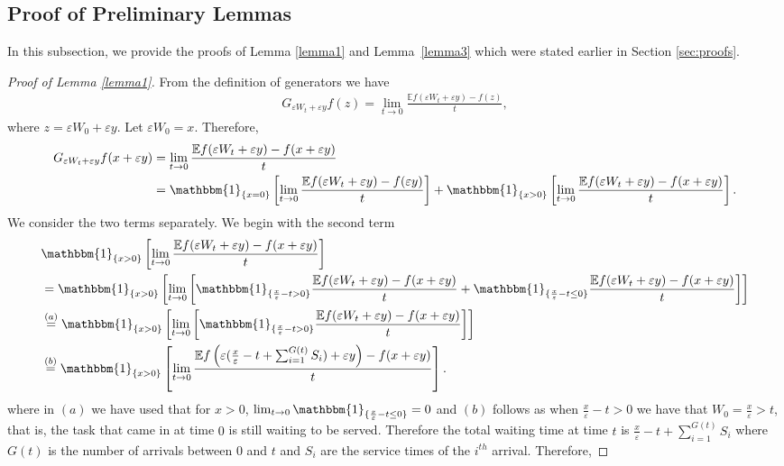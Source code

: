 \documentclass[11pt,letterpaper,reqno]{article}
\theoremstyle{thmstyleone}%
\theoremstyle{thmstyletwo}%
\theoremstyle{thmstylethree}%
\numberwithin{equation}{section}
\begin{document}
\subsection{Proof of Preliminary Lemmas}\label{sec:preliminarylemmaproof}
In this subsection, we provide the proofs of Lemma \ref{lemma1} and Lemma~\ref{lemma3} which were stated earlier in Section \ref{sec:proofs}.
\begin{proof}[Proof of Lemma \ref{lemma1}]
    From the definition of generators we have
\begin{align*}
   G_{\varepsilon W_t+\varepsilon y}f(z)=\lim_{t \to 0} \frac{\mathbb Ef(\varepsilon W_t+\varepsilon y)-f(z)}{t},
\end{align*}
where $z=\varepsilon W_0+\varepsilon y$. Let $\varepsilon W_0=x$. Therefore,
\begin{align}\label{e1}
       G_{\varepsilon W_t+\varepsilon y}f(x+\varepsilon y)&=\lim_{t \to 0} \frac{\mathbb Ef(\varepsilon W_t+\varepsilon y)-f(x+\varepsilon y)}{t} \nonumber\\
       &=\mathbbm{1}_{\{x=0\}}\left[ \lim_{t \to 0} \frac{\mathbb Ef(\varepsilon W_t+\varepsilon y)-f(\varepsilon y)}{t}\right]+\mathbbm{1}_{\{x>0\}}\left[ \lim_{t \to 0} \frac{\mathbb Ef(\varepsilon W_t+\varepsilon y)-f(x+\varepsilon y)}{t}\right].
\end{align}
 We consider the two terms separately. We begin with the second term
\begin{align*}
    &\mathbbm{1}_{\{x>0\}}\left[ \lim_{t \to 0} \frac{\mathbb Ef(\varepsilon W_t+\varepsilon y)-f(x+\varepsilon y)}{t}\right]\\
    &=\mathbbm{1}_{\{x>0\}}\left[ \lim_{t \to 0}\left[\mathbbm{1}_{\{\frac{x}{\varepsilon}-t>0\}} \frac{\mathbb Ef(\varepsilon W_t+\varepsilon y)-f(x+\varepsilon y)}{t}+\mathbbm{1}_{\{\frac{x}{\varepsilon} -t\leq 0\}}\frac{\mathbb Ef(\varepsilon W_t+\varepsilon y)-f(x+\varepsilon y)}{t}\right]\right]\\
    &\stackrel{(a)}{=}\mathbbm{1}_{\{x>0\}}\left[ \lim_{t \to 0}\left[\mathbbm{1}_{\{\frac{x}{\varepsilon}-t>0\}} \frac{\mathbb Ef(\varepsilon W_t+\varepsilon y)-f(x+\varepsilon y)}{t}\right]\right]\\
    &\stackrel{(b)}{=}\mathbbm{1}_{\{x>0\}}\left[\lim_{t \to 0}\frac{\mathbb E f\left(\varepsilon(\frac{x}{\varepsilon}-t+\sum_{i=1}^{G(t)}S_i)+\varepsilon y\right)-f(x+\varepsilon y)}{t} \right].
\end{align*}
 where in $(a)$ we have used that for $x>0$, $\lim_{t \to 0}\mathbbm{1}_{\{\frac{x}{\varepsilon}-t \leq 0\}}=0$ and $(b)$ follows as when $\frac{x}{\varepsilon}-t >0$ we have that $W_0=\frac{x}{\varepsilon}>t$, that is, the task that came in at time $0$ is still waiting to be served. Therefore the total waiting time at time $t$ is $\frac{x}{\varepsilon}-t+\sum_{i=1}^{G(t)}S_i$ where  $G(t)$ is the number of arrivals between $0$ and $t$ and $S_i$ are the service times of the $i^{th}$ arrival. Therefore,

\end{proof}
\end{document}
